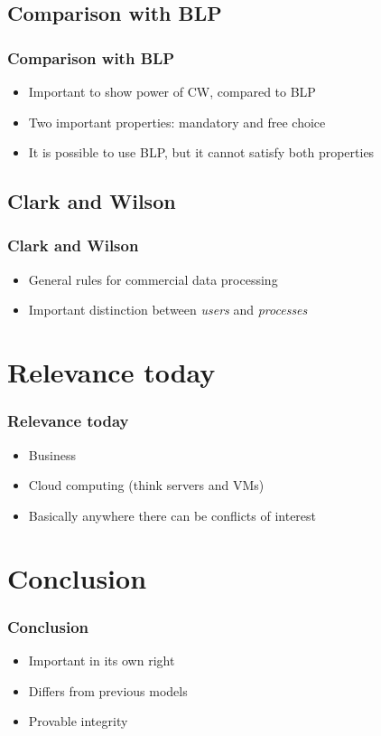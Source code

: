 \documentclass[10pt]{beamer}
\begin{document}
\subsection{Comparison with BLP}
\begin{frame}
	\frametitle{Comparison with BLP}
	
	\begin{itemize}
		\item Important to show power of CW, compared to BLP
		\item Two important properties: mandatory and free choice
		\item It is possible to use BLP, but it cannot satisfy both properties
	\end{itemize}
\end{frame}

\subsection{Clark and Wilson}
\begin{frame}
	\frametitle{Clark and Wilson}
	
	\begin{itemize}
		\item General rules for commercial data processing
		\item Important distinction between \textit{users} and \textit{processes}
	\end{itemize}
\end{frame}

\section{Relevance today}
\begin{frame}
	\frametitle{Relevance today}
	
	\begin{itemize}
		\item Business
		\item Cloud computing (think servers and VMs)
		\item Basically anywhere there can be conflicts of interest
	\end{itemize}
\end{frame}

\section{Conclusion}
\begin{frame}
	\frametitle{Conclusion}
	
	\begin{itemize}
		\item Important in its own right
		\item Differs from previous models
		\item Provable integrity
	\end{itemize}
\end{frame}

{\aauwavesbg
\begin{frame}
\end{frame}}
\end{document}

